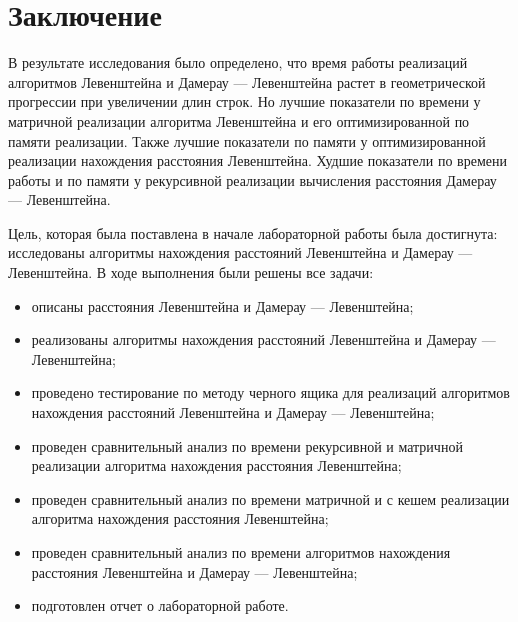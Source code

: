 \chapter*{Заключение}

В результате исследования было определено, что время работы реализаций алгоритмов Левенштейна и Дамерау --- Левенштейна растет в геометрической прогрессии при увеличении длин строк. Но лучшие показатели по времени у матричной реализации алгоритма Левенштейна и его оптимизированной по памяти реализации. Также лучшие показатели по памяти у оптимизированной реализации нахождения расстояния Левенштейна. Худшие показатели по времени работы и по памяти у рекурсивной реализации вычисления расстояния Дамерау --- Левенштейна.

Цель, которая была поставлена в начале лабораторной работы была достигнута: исследованы алгоритмы нахождения расстояний Левенштейна и Дамерау --- Левенштейна. В ходе выполнения были решены все задачи:

\begin{itemize}[label={---}]
	\item описаны расстояния Левенштейна и Дамерау --- Левенштейна;
	\item реализованы алгоритмы нахождения расстояний Левенштейна и Дамерау --- Левенштейна;
	
	\item проведено тестирование по методу черного ящика для реализаций алгоритмов нахождения расстояний Левенштейна и Дамерау --- Левенштейна;
	
	\item проведен сравнительный анализ по времени рекурсивной и матричной реализации алгоритма нахождения расстояния Левенштейна;
	
	\item проведен сравнительный анализ по времени матричной и с кешем реализации алгоритма нахождения расстояния Левенштейна;
	
	\item проведен сравнительный анализ по времени алгоритмов нахождения расстояния Левенштейна и Дамерау --- Левенштейна;
	
	\item подготовлен отчет о лабораторной работе.
\end{itemize}